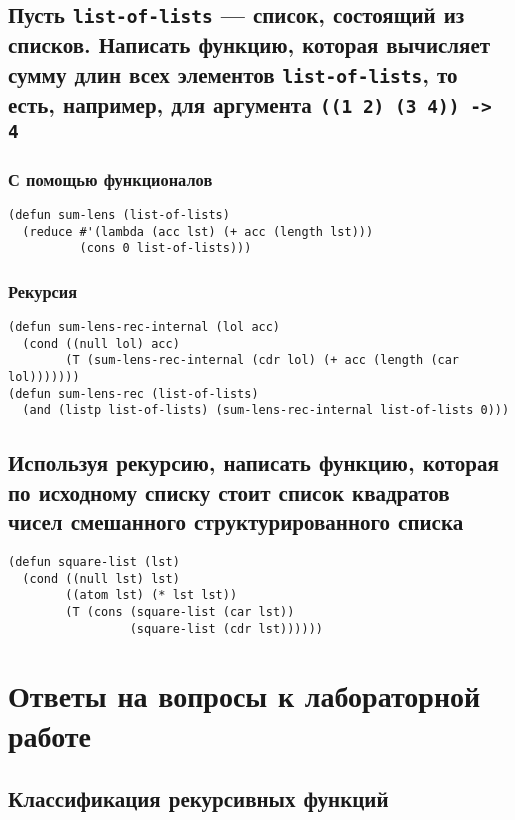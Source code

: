 \section{Пусть \texttt{list-of-lists} --- список, состоящий из списков. Написать функцию, которая вычисляет сумму длин всех элементов \texttt{list-of-lists}, то есть, например, для аргумента \texttt{((1 2) (3 4)) -> 4}}

\subsection{С помощью функционалов}

\begin{lstlisting}
(defun sum-lens (list-of-lists)
  (reduce #'(lambda (acc lst) (+ acc (length lst)))
          (cons 0 list-of-lists)))
\end{lstlisting}

\subsection{Рекурсия}

\begin{lstlisting}
(defun sum-lens-rec-internal (lol acc)
  (cond ((null lol) acc)
        (T (sum-lens-rec-internal (cdr lol) (+ acc (length (car lol)))))))
(defun sum-lens-rec (list-of-lists)
  (and (listp list-of-lists) (sum-lens-rec-internal list-of-lists 0)))
\end{lstlisting}

\section{Используя рекурсию, написать функцию, которая по исходному списку стоит список квадратов чисел смешанного структурированного списка}

\begin{lstlisting}
(defun square-list (lst)
  (cond ((null lst) lst)
        ((atom lst) (* lst lst))
        (T (cons (square-list (car lst))
                 (square-list (cdr lst))))))
\end{lstlisting}

\chapter{Ответы на вопросы к лабораторной работе}

\section{Классификация рекурсивных функций}

